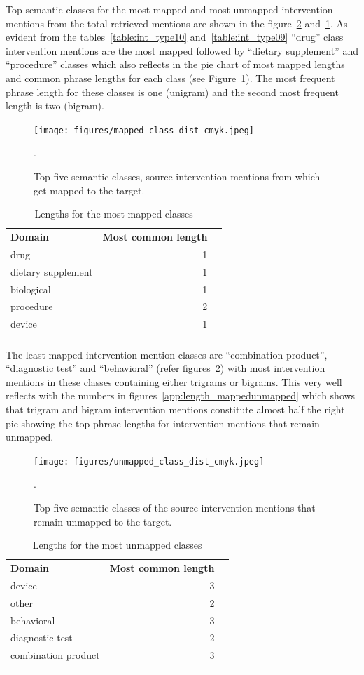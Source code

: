 \documentclass[11pt]{article}
\begin{document}
Top semantic classes for the most mapped and most unmapped intervention mentions from the total retrieved mentions are shown in the figure~\ref{app:unmapped_class_dist} and~\ref{app:mapped_class_dist}.
As evident from the tables~\ref{table:int_type10} and~\ref{table:int_type09} ``drug'' class intervention mentions are the most mapped followed by ``dietary supplement'' and ``procedure'' classes which also reflects in the pie chart of most mapped lengths and common phrase lengths for each class (see Figure~\ref{app:mapped_class_dist}).
The most frequent phrase length for these classes is one (unigram) and the second most frequent length is two (bigram).
%
\begin{figure}[hbt!]
\centering
\texttt{[image: figures/mapped\_class\_dist\_cmyk.jpeg]}
\caption{Top five semantic classes, source intervention mentions from which get mapped to the target.}.
\label{app:mapped_class_dist}
\end{figure}
%
\begin{table}[!htbp]
\centering
\begin{tabular}{lrl}
\Xhline{1pt} \textbf{Domain} & \textbf{ Most common length } \\ \Xhline{1pt}
drug & 1 \\
dietary supplement & 1 \\
biological & 1 \\
procedure & 2 \\
device & 1 \\
\Xhline{1pt}
\end{tabular}
\caption{Lengths for the most mapped classes}
\label{table:len_mapped_classes} 
\end{table}
%
%
The least mapped intervention mention classes are ``combination product'', ``diagnostic test'' and ``behavioral'' (refer figures~\ref{app:unmapped_class_dist}) with most intervention mentions in these classes containing either trigrams or bigrams.
This very well reflects with the numbers in figures~\ref{app:length_mappedunmapped} which shows that trigram and bigram intervention mentions constitute almost half the right pie showing the top phrase lengths for intervention mentions that remain unmapped.
%
\begin{figure}[hbt!]
\centering
\texttt{[image: figures/unmapped\_class\_dist\_cmyk.jpeg]}
\caption{Top five semantic classes of the source intervention mentions that remain unmapped to the target.}.
\label{app:unmapped_class_dist}
\end{figure}
%
\begin{table}[!htbp]
\centering
\begin{tabular}{lrl}
\Xhline{1pt} \textbf{Domain} & \textbf{ Most common length } \\ \Xhline{1pt}
device & 3 \\
other & 2 \\
behavioral & 3 \\
diagnostic test & 2 \\
combination product & 3 \\
\Xhline{1pt}
\end{tabular}
\caption{Lengths for the most unmapped classes}
\label{table:len_unmapped_classes} 
\end{table}
\end{document}
